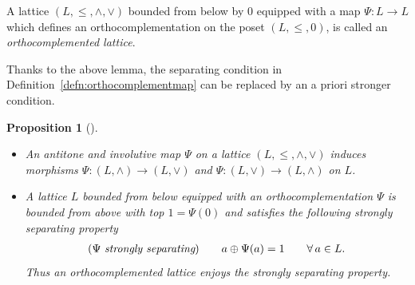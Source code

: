 \documentclass[10pt,a4paper]{amsart}
\numberwithin{equation}{section}
\newtheorem{Proposition}[Theorem]{Proposition}
\newcommand{\pone}{separating\xspace }
\begin{document}
\begin{Definition} \label{defn:orthocomplemented_lattice}	
A lattice $(L, \leq, \wedge, \vee)$ bounded from below by $0$ equipped with a map $\Psi\colon L\to L$ which defines an orthocomplementation on the poset $(L, \leq , 0)$, is called an {\it orthocomplemented lattice}.
\end{Definition}

Thanks to the above lemma, the separating condition in Definition~\ref{defn:orthocomplementmap} can be replaced by an a priori stronger condition.

\begin{Proposition}[{\cite[Propositions 1.1(iii) and~1.7]{CM}}] \label{prop:Psistronglysep}\qquad
\begin{itemize}\itemsep=0pt
	\item An antitone and involutive map $\Psi$ on a lattice $(L, \leq, \wedge, \vee)$ induces morphisms
 $\Psi\colon (L, \wedge)\to (L, \vee)$ and $\Psi\colon (L, \vee)\to (L, \wedge)$ on $L$.
 \item
A lattice $L$ bounded from below equipped with an orthocomplementation $\Psi$ is bounded from above with top $1=\Psi(0)$ and satisfies the following {\it strongly separating} property 	 \begin{gather}\label{eq:Psistronglyseparating}
(\Psi \text{ \it strongly \pone})\qquad a\oplus \Psi(a) =1 \qquad \forall\, a\in L.
\end{gather}
Thus an orthocomplemented lattice enjoys the strongly separating property.
\end{itemize}
\end{Proposition}
\end{document}
